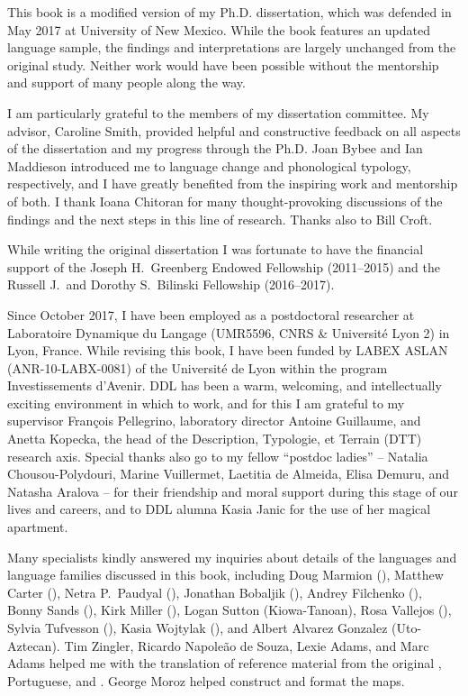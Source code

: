 \addchap{\lsAcknowledgementTitle} 

This book is a modified version of my Ph.D. dissertation, which was defended in May 2017 at University of New Mexico. While the book features an updated language sample, the findings and interpretations are largely unchanged from the original study. Neither work would have been possible without the mentorship and support of many people along the way.

I am particularly grateful to the members of my dissertation committee. My advisor, Caroline Smith, provided helpful and constructive feedback on all aspects of the dissertation and my progress through the Ph.D. Joan Bybee and Ian Maddieson introduced me to language change and phonological typology, respectively, and I have greatly benefited from the inspiring work and mentorship of both. I thank Ioana Chitoran for many thought-provoking discussions of the findings and the next steps in this line of research. Thanks also to Bill Croft.

While writing the original dissertation I was fortunate to have the financial support of the Joseph H.\ Greenberg Endowed Fellowship (2011--2015) and the Russell J.\ and Dorothy S.\ Bilinski Fellowship (2016--2017).

Since October 2017, I have been employed as a postdoctoral researcher at Laboratoire Dynamique du Langage (UMR5596, CNRS \& Université Lyon 2) in Lyon, France. While revising this book, I have been funded by LABEX ASLAN (ANR-10-LABX-0081) of the Université de Lyon within the  program Investissements d’Avenir. DDL has been a warm, welcoming, and intellectually exciting environment in which to work, and for this I am grateful to my supervisor François Pellegrino, laboratory director Antoine Guillaume, and Anetta Kopecka, the head of the Description, Typologie, et Terrain (DTT) research axis. Special thanks also go to my fellow ``postdoc ladies'' -- Natalia Chousou-Polydouri, Marine Vuillermet, Laetitia de Almeida, Elisa Demuru, and Natasha Aralova -- for their friendship and moral support during this stage of our lives and careers, and to DDL alumna Kasia Janic for the use of her magical apartment.

Many specialists kindly answered my inquiries about details of the languages and language families discussed in this book, including Doug Marmion (), Matthew Carter (), Netra P.\ Paudyal (), Jonathan Bobaljik (), Andrey Filchenko (), Bonny Sands (), Kirk Miller (), Logan Sutton (Kiowa-Tanoan), Rosa Vallejos (), Sylvia Tufvesson (), Kasia Wojtylak (), and Albert Alvarez Gonzalez (Uto-Aztecan). Tim Zingler, Ricardo Napoleão de Souza, Lexie Adams, and Marc Adams helped me with the translation of reference material from the original , Portuguese, and . George Moroz helped construct and format the maps.

